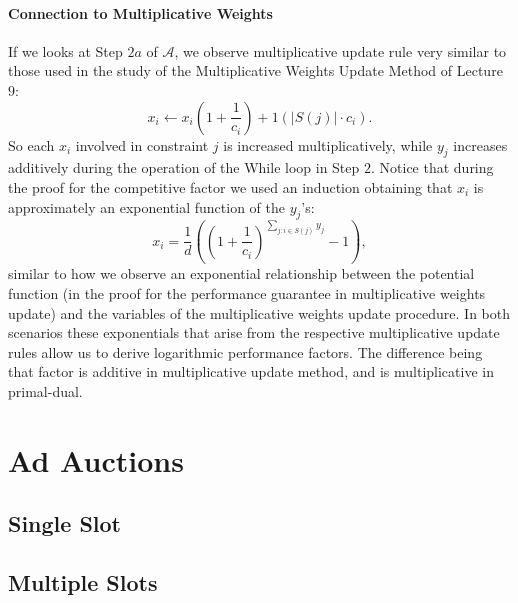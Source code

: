 \documentclass[letterpaper,12pt,oneside,onecolumn]{article}
\newcommand{\cA}{\mathcal{A}} \newcommand{\cB}{\mathcal{B}}
\begin{document}
\paragraph{Connection to Multiplicative Weights}
If we looks at Step $2a$ of $\cA$, we observe multiplicative update rule very similar to those used in the study of the Multiplicative Weights Update Method of Lecture $9$:
$$x_i \leftarrow x_i(1+\frac{1}{c_i}) + 1(|S(j)|\cdot c_i).$$
So each $x_i$ involved in constraint $j$ is increased multiplicatively, while $y_j$ increases additively during the operation of the While loop in Step $2$. Notice that during the proof for the competitive factor we used an induction obtaining that $x_i$ is approximately an exponential function of the $y_j$'s:
$$x_i = \frac{1}{d}((1+\frac{1}{c_i})^{\sum_{j : i \in S(j)} y_j} -1),$$
similar to how we observe an exponential relationship between the potential function (in the proof for the performance guarantee in multiplicative weights update) and the variables of the multiplicative weights update procedure. In both scenarios these exponentials that arise from the respective multiplicative update rules allow us to derive logarithmic performance factors. The difference being that factor is additive in multiplicative update method, and is multiplicative in primal-dual.
\section{Ad Auctions}
\subsection{Single Slot}

\subsection{Multiple Slots}


\end{document}
